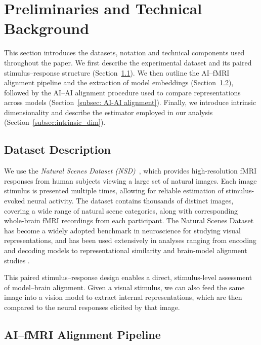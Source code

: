 \documentclass{article}
\theoremstyle{plain}
\theoremstyle{definition}
\theoremstyle{remark}
\begin{document}
\section{Preliminaries and Technical Background}
\label{sec:preliminaries}

This section introduces the datasets, notation and technical components used throughout the paper.
We first describe the experimental dataset and its paired stimulus--response structure (Section~\ref{subsec:Dataset}).
We then outline the AI--fMRI alignment pipeline and the extraction of model embeddings (Section~\ref{subsec: AI-fMRI alignment}), followed by the AI--AI alignment procedure used to compare representations across models (Section~\ref{subsec: AI-AI alignment}).
Finally, we introduce intrinsic dimensionality and describe the estimator employed in our analysis (Section~\ref{subsec:intrinsic_dim}).

\subsection{Dataset Description}
\label{subsec:Dataset}

We use the \emph{Natural Scenes Dataset (NSD)}~\cite{allen2022massive}, which provides high-resolution fMRI responses from human subjects viewing a large set of natural images. Each image stimulus is presented multiple times, allowing for reliable estimation of stimulus-evoked neural activity. The dataset contains thousands of distinct images, covering a wide range of natural scene categories, along with corresponding whole-brain fMRI recordings from each participant. The Natural Scenes Dataset has become a widely adopted benchmark in neuroscience for studying visual representations, and has been used extensively in analyses ranging from encoding and decoding models to representational similarity and brain-model alignment studies \cite{doerig2023neuroconnectionist, takagi2023high, scotti2023reconstructing, doerig2025high, prince2024contrastive}.

This paired stimulus--response design enables a direct, stimulus-level assessment of model--brain alignment. Given a visual stimulus, we can also feed the same image into a vision model to extract internal representations, which are then compared to the neural responses elicited by that image. 


\subsection{AI--fMRI Alignment Pipeline}
\label{subsec: AI-fMRI alignment}
\end{document}
